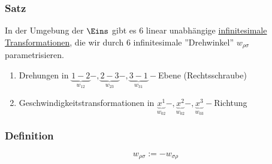 \documentclass[twoside,a4paper]{scrartcl}
\renewcommand{\1}{\mathds{1}}
\begin{document}
\subsubsection*{Satz}
In der Umgebung der $\Eins$ gibt es 6 linear unabhängige \underline{infinitesimale Transformationen}, die wir durch 6 infinitesimale ''Drehwinkel'' $w_{\rho\sigma}$ parametrisieren.
\begin{enumerate}
\item Drehungen in $\underbrace{1-2}_{w_{12}}-,\underbrace{2-3}_{w_{23}}-,\underbrace{3-1}_{w_{31}}-$Ebene (Rechtsschraube)
\item Geschwindigkeitstransformationen in $\underbrace{x^1}_{w_{02}}-,\underbrace{x^2}_{w_{02}}-,\underbrace{x^3}_{w_{03}}-$Richtung
\end{enumerate}
\subsubsection*{Definition}
$$w_{\rho\sigma}:=-w_{\sigma\rho}$$
\end{document}
